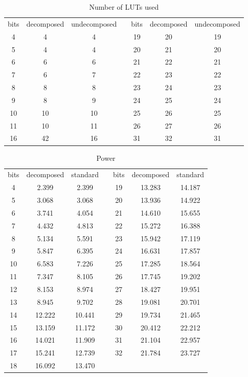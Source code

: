 \documentclass[12pt]{toptesi}
\begin{document}
\begin{table}%
	\centering
	\caption{Number of LUTs used}
\vspace{6pt}		
		\begin{tabular}{cccp{4mm}ccc}
\toprule		
bits & decomposed & undecomposed & & bits & decomposed & undecomposed \\
\cmidrule{1-3}
\cmidrule{5-7}
4  &  4 &  4 & & 19 & 20 & 19 \\
5  &  4 &  4 & & 20 & 21 & 20 \\
6  &  6 &  6 & & 21 & 22 & 21 \\
7  &  6 &  7 & & 22 & 23 & 22 \\
8  &  8 &  8 & & 23 & 24 & 23 \\
9  &  8 &  9 & & 24 & 25 & 24 \\
10 & 10 & 10 & & 25 & 26 & 25 \\
11 & 10 & 11 & & 26 & 27 & 26 \\
16 & 42 & 16 & & 31 & 32 & 31 \\
\bottomrule
		\end{tabular}
    \label{tab:fpga_area}
\end{table}


\begin{table}%
\centering
    \caption{Power}
		\vspace{6pt}
    \begin{tabular}{ccccccc}
		\toprule
    bits	 & decomposed	 & standard && bits	 & decomposed	 & standard\\ 
    \cmidrule{1-3}\cmidrule{5-7} 
    4	 & 2.399	 & 2.399 && 19	 & 13.283	 & 14.187 \\ 
    5	 & 3.068	 & 3.068 && 20	 & 13.936	 & 14.922  \\ 
    6	 & 3.741	 & 4.054 && 21	 & 14.610	 & 15.655 \\ 
    7	 & 4.432	 & 4.813 && 22	 & 15.272	 & 16.388 \\ 
    8	 & 5.134	 & 5.591 && 23	 & 15.942	 & 17.119\\ 
    9	 & 5.847	 & 6.395 && 24	 & 16.631	 & 17.857  \\ 
    10	 & 6.583	 & 7.226 && 25	 & 17.285	 & 18.564 \\ 
    11	 & 7.347	 & 8.105 && 26	 & 17.745	 & 19.202 \\ 
    12	 & 8.153	 & 8.974 && 27	 & 18.427	 & 19.951 \\ 
    13	 & 8.945	 & 9.702 && 28	 & 19.081	 & 20.701 \\ 
    14	 & 12.222	 & 10.441 && 29	 & 19.734	 & 21.465 \\ 
    15	 & 13.159	 & 11.172 && 30	 & 20.412	 & 22.212 \\ 
    16	 & 14.021	 & 11.909 && 31	 & 21.104	 & 22.957 \\ 
    17	 & 15.241	 & 12.739 && 32	 & 21.784	 & 23.727 \\ 
    18	 & 16.092	 & 13.470   \\ 
		\bottomrule
    \end{tabular}
    \label{tab:fpga_power}
\end{table}
\end{document}
